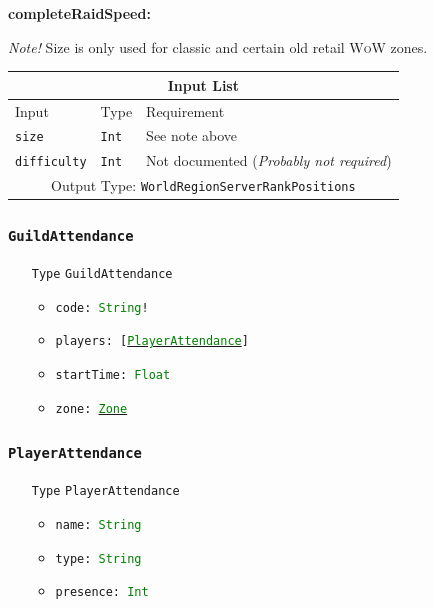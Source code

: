 \documentclass[10pt, a4paper]{memoir}
\numberwithin{equation}{section}
\theoremstyle{plain}
\theoremstyle{defp}
\theoremstyle{dotless}
\theoremstyle{definition}
\theoremstyle{dotless}
\theoremstyle{dotless}
\theoremstyle{defp}
\theoremstyle{defp}
\theoremstyle{be}          %
\theoremstyle{defp}
\newcommand\ttt[1]{\texttt{#1}}
\newcommand\tsc[1]{\textsc{#1}}
\newcommand\type[1]{\ttt{\textcolor{green}{#1}}}
\begin{document}
\medskip

\textbf{completeRaidSpeed:}

\textit{Note!} Size is only used for classic and certain old retail \tsc{WoW} zones.

\begin{table}[h!]
	\centering
	\begin{tabular}{ |p{4.2cm}|p{6cm}|p{3cm}|  }
		\hline
		\multicolumn{3}{|c|}{Input List} \\
		\hline
		Input & Type & Requirement\\
		\hline
		\ttt{size} & \ttt{Int} & See note above\\
		\ttt{difficulty} & \ttt{Int} & Not documented (\textit{Probably not required})\\
		\hline
		\multicolumn{3}{|c|}{Output Type: \ttt{WorldRegionServerRankPositions}} \\
		\hline
	\end{tabular}
\end{table}

\subsubsection{\ttt{GuildAttendance}}\label{sec:GuildAttendance}

\begin{itemize}[noitemsep,topsep=1pt]
\item[\ttt{Type}] \ttt{GuildAttendance}
\begin{itemize}[itemsep=1pt, topsep=1pt]
\item \ttt{code: \type{String}!}
\item \ttt{players: [\hyperref[sec:PlayerAttendance]{\type{PlayerAttendance}}]}
\item \ttt{startTime: \type{Float}}
\item \ttt{zone: \hyperref[sec:Zone]{\type{Zone}}}
\end{itemize}
\end{itemize}

\subsubsection{\ttt{PlayerAttendance}}\label{sec:PlayerAttendance}

\begin{itemize}[noitemsep,topsep=1pt]
\item[\ttt{Type}] \ttt{PlayerAttendance}
\begin{itemize}[itemsep=1pt,topsep=1pt]
\item \ttt{name: \type{String}}
\item \ttt{type: \type{String}}
\item \ttt{presence: \type{Int}}
\end{itemize}
\end{itemize}
\end{document}
